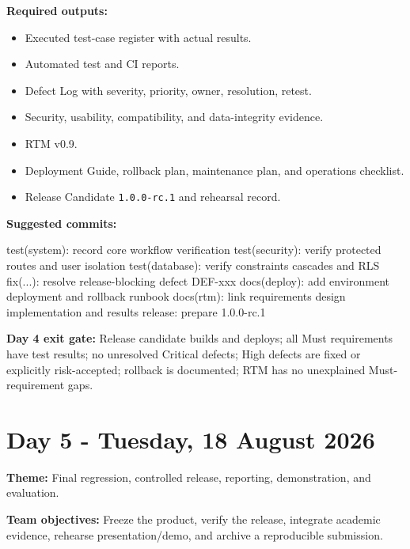 \documentclass[
  10pt,
  a4paper,
  oneside]{report}
\newenvironment{Shaded}{}{}
\newcommand{\NormalTok}[1]{#1}
\providecommand{\tightlist}{%
  \setlength{\itemsep}{0pt}\setlength{\parskip}{0pt}}
\begin{document}
\textbf{Required outputs:}

\begin{itemize}
\tightlist
\item
  Executed test-case register with actual results.
\item
  Automated test and CI reports.
\item
  Defect Log with severity, priority, owner, resolution, retest.
\item
  Security, usability, compatibility, and data-integrity evidence.
\item
  RTM v0.9.
\item
  Deployment Guide, rollback plan, maintenance plan, and operations
  checklist.
\item
  Release Candidate \texttt{1.0.0-rc.1} and rehearsal record.
\end{itemize}

\textbf{Suggested commits:}

\begin{Shaded}
\begin{Highlighting}[]
\NormalTok{test(system): record core workflow verification}
\NormalTok{test(security): verify protected routes and user isolation}
\NormalTok{test(database): verify constraints cascades and RLS}
\NormalTok{fix(...): resolve release{-}blocking defect DEF{-}xxx}
\NormalTok{docs(deploy): add environment deployment and rollback runbook}
\NormalTok{docs(rtm): link requirements design implementation and results}
\NormalTok{release: prepare 1.0.0{-}rc.1}
\end{Highlighting}
\end{Shaded}

\textbf{Day 4 exit gate:} Release candidate builds and deploys; all Must
requirements have test results; no unresolved Critical defects; High
defects are fixed or explicitly risk-accepted; rollback is documented;
RTM has no unexplained Must-requirement gaps.

\section{Day 5 - Tuesday, 18 August
2026}\label{day-5---tuesday-18-august-2026}

\textbf{Theme:} Final regression, controlled release, reporting,
demonstration, and evaluation.

\textbf{Team objectives:} Freeze the product, verify the release,
integrate academic evidence, rehearse presentation/demo, and archive a
reproducible submission.
\end{document}
